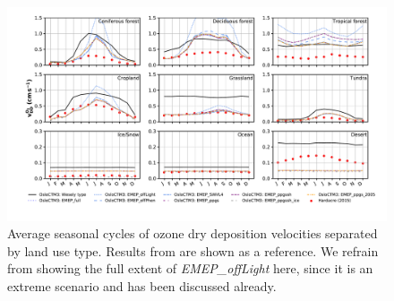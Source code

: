 \documentclass[gmd, manuscript]{copernicus}
\begin{document}
%
\begin{figure}[t]
  \includegraphics[width=12cm]{fig07}
  \caption{Average seasonal cycles of ozone dry deposition velocities separated by land use type. Results from \citep{ACP:Hardacre2015} are shown as a reference. We refrain from showing the full extent of \emph{EMEP\_offLight} here, since it is an extreme scenario and has been discussed already.}
  \label{fig:mmm_drydep_season_pft}
\end{figure}
%
\end{document}
